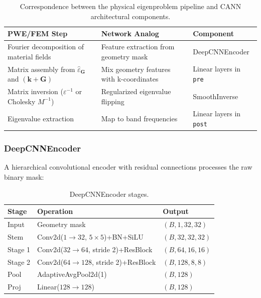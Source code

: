 \documentclass[11pt]{article}
\begin{document}
\begin{table}[t]
    \centering
    \caption{Correspondence between the physical eigenproblem pipeline and CANN architectural components.}
    \label{tab:physics_mirror}
    \begin{tabular}{@{}lll@{}}
        \toprule
        \textbf{PWE/FEM Step} & \textbf{Network Analog} & \textbf{Component} \\
        \midrule
        Fourier decomposition of material fields & Feature extraction from geometry mask & DeepCNNEncoder \\
        Matrix assembly from $\hat{\varepsilon}_\mathbf{G}$ and $(\mathbf{k}+\mathbf{G})$ & Mix geometry features with k-coordinates & Linear layers in \texttt{pre} \\
        Matrix inversion ($\varepsilon^{-1}$ or Cholesky $M^{-1}$) & Regularized eigenvalue flipping & SmoothInverse \\
        Eigenvalue extraction & Map to band frequencies & Linear layers in \texttt{post} \\
        \bottomrule
    \end{tabular}
\end{table}

\subsubsection{DeepCNNEncoder}

A hierarchical convolutional encoder with residual connections processes the raw binary mask:

\begin{table}[H]
    \centering
    \caption{DeepCNNEncoder stages.}
    \label{tab:encoder}
    \begin{tabular}{@{}lll@{}}
        \toprule
        \textbf{Stage} & \textbf{Operation} & \textbf{Output} \\
        \midrule
        Input & Geometry mask & $(B, 1, 32, 32)$ \\
        Stem  & Conv2d($1{\to}32$, $5{\times}5$)+BN+SiLU & $(B, 32, 32, 32)$ \\
        Stage 1 & Conv2d($32{\to}64$, stride 2)+ResBlock & $(B, 64, 16, 16)$ \\
        Stage 2 & Conv2d($64{\to}128$, stride 2)+ResBlock & $(B, 128, 8, 8)$ \\
        Pool  & AdaptiveAvgPool2d(1) & $(B, 128)$ \\
        Proj  & Linear($128 \to 128$) & $(B, 128)$ \\
        \bottomrule
    \end{tabular}
\end{table}
\end{document}
